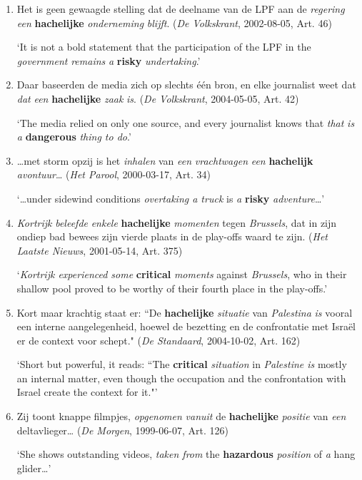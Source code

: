 \documentclass[
]{book}
\begin{document}
\begin{enumerate}
\def\labelenumi{(\arabic{enumi})}
\setcounter{enumi}{18}
\item
  Het is geen gewaagde stelling dat de deelname van de LPF aan de \emph{regering} \emph{een} \textbf{hachelijke} \emph{onderneming} \emph{blijft}. (\emph{De Volkskrant}, 2002-08-05, Art. 46)

  `It is not a bold statement that the participation of the LPF in the \emph{government} \emph{remains} \emph{a} \textbf{risky} \emph{undertaking}.'
\item
  Daar baseerden de media zich op slechts één bron, en elke journalist weet dat \emph{dat} \emph{een} \textbf{hachelijke} \emph{zaak} \emph{is}. (\emph{De Volkskrant}, 2004-05-05, Art. 42)

  `The media relied on only one source, and every journalist knows that \emph{that} \emph{is} \emph{a} \textbf{dangerous} \emph{thing to do}.'
\item
  \ldots met storm opzij is het \emph{inhalen} van \emph{een} \emph{vrachtwagen} \emph{een} \textbf{hachelijk} \emph{avontuur}\ldots{} (\emph{Het Parool}, 2000-03-17, Art. 34)

  `\ldots under sidewind conditions \emph{overtaking a truck} is \emph{a} \textbf{risky} \emph{adventure}\ldots{}'
\item
  \emph{Kortrijk} \emph{beleefde} \emph{enkele} \textbf{hachelijke} \emph{momenten} tegen \emph{Brussels}, dat in zijn ondiep bad bewees zijn vierde plaats in de play-offs waard te zijn. (\emph{Het Laatste Nieuws}, 2001-05-14, Art. 375)

  `\emph{Kortrijk experienced some} \textbf{critical} \emph{moments} against \emph{Brussels}, who in their shallow pool proved to be worthy of their fourth place in the play-offs.'
\item
  Kort maar krachtig staat er: ``De \textbf{hachelijke} \emph{situatie} van \emph{Palestina} \emph{is} vooral een interne aangelegenheid, hoewel de bezetting en de confrontatie met Israël er de context voor schept." (\emph{De Standaard}, 2004-10-02, Art. 162)

  `Short but powerful, it reads: ``The \textbf{critical} \emph{situation} in \emph{Palestine is} mostly an internal matter, even though the occupation and the confrontation with Israel create the context for it."'
\item
  Zij toont knappe filmpjes, \emph{opgenomen} \emph{vanuit} de \textbf{hachelijke} \emph{positie} van \emph{een} deltavlieger\ldots{} (\emph{De Morgen}, 1999-06-07, Art. 126)

  `She shows outstanding videos, \emph{taken from} the \textbf{hazardous} \emph{position} of \emph{a} hang glider\ldots{}'
\end{enumerate}
\end{document}
